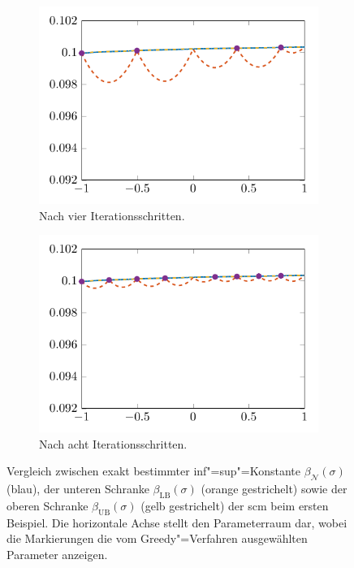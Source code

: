 \documentclass[../main.tex]{subfiles}
\begin{document}
\begin{figure}[tb]
\begin{subfigure}[b]{0.495\textwidth}
        \includegraphics[width=1\textwidth]{figures/chapter5/ch5ex1_scm_plot_4.pdf}
        \caption{Nach vier Iterationsschritten.}
    \end{subfigure}
    \begin{subfigure}[b]{0.495\textwidth}
        \centering
        \includegraphics[width=1\textwidth]{figures/chapter5/ch5ex1_scm_plot_8.pdf}
        \caption{Nach acht Iterationsschritten.}
    \end{subfigure}
    \caption[Vergleich der SCM"=Schranke über mehrere Iterationsschritte, erstes Beispiel.]{%
        Vergleich zwischen exakt bestimmter inf"=sup"=Konstante $\beta_{\mathcal N}(\sigma)$ (blau), der unteren Schranke $\beta_{\mathrm{LB}}(\sigma)$ (orange gestrichelt) sowie der oberen Schranke $\beta_{\mathrm{UB}}(\sigma)$ (gelb gestrichelt) der \ac{scm} beim ersten Beispiel.
        Die horizontale Achse stellt den Parameterraum dar, wobei die Markierungen die vom Greedy"=Verfahren ausgewählten Parameter anzeigen.
    }
    \label{figure:vergleich_scm_iterationen}
\end{figure}
\end{document}
